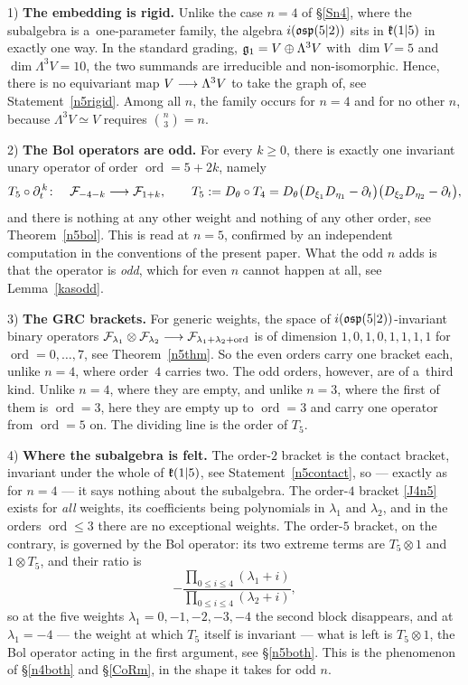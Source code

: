 \documentclass[12pt,a4paper]{amsart}
\theoremstyle{thm}
\theoremstyle{definition}
\newcommand {\tp}{\otimes}
\newcommand {\Nord}{\operatorname{ord}}   %
\begin{document}
1) \textbf{The embedding is rigid.} Unlike the case $n=4$ of \S\ref{Sn4}, where the
subalgebra is a~one-parameter family, the algebra $i({\mathfrak{osp}}(5|2))$ sits in ${\mathfrak{k}}(1|5)$ in
exactly one way. In the standard grading, ${\mathfrak{g}}_1=V\oplus\Lambda^3V$ with $\dim V=5$ and
$\dim\Lambda^3V=10$, the two summands are irreducible and non-isomorphic. Hence, there is no
equivariant map $V\longrightarrow\Lambda^3V$ to take the graph of, see Statement~\ref{n5rigid}. Among all
$n$, the family occurs for $n=4$ and for no other $n$, because $\Lambda^3V\simeq V$ requires
$\binom{n}{3}=n$.

2) \textbf{The Bol operators are odd.} For every $k\geq0$, there is exactly one
invariant unary operator of order $\Nord=5+2k$, namely
\[
T_5\circ\partial_t^{\,k}\colon\quad{\mathcal F}_{-4-k}\longrightarrow{\mathcal F}_{1+k},\qquad
T_5:=D_{\theta}\circ T_4=D_{\theta}\big(D_{\xi_1}D_{\eta_1}-\partial_t\big)
\big(D_{\xi_2}D_{\eta_2}-\partial_t\big),
\]
and there is nothing at any other weight and nothing of any other order, see
Theorem~\ref{n5bol}. This is \cite[Thm~1.4.2]{BLS1} read at $n=5$, confirmed by an independent
computation in the conventions of the present paper. What the odd $n$ adds is that the operator
is \textit{odd}, which for even $n$ cannot happen at all, see Lemma~\ref{kasodd}.

3) \textbf{The GRC brackets.} For generic weights, the space of
$i({\mathfrak{osp}}(5|2))$-invariant binary operators
$\cF_{\lambda_1}\tp\cF_{\lambda_2}\tto\cF_{\lambda_1+\lambda_2+\Nord}$ is of dimension
$1,0,1,0,1,1,1,1$ for $\Nord=0,\dots,7$, see Theorem~\ref{n5thm}. So the even orders carry one bracket each, unlike $n=4$, where
order~$4$ carries two. The odd orders, however, are of a~third kind. Unlike
$n=4$, where they are empty, and unlike $n=3$, where the first of them is $\Nord=3$, here they
are empty up to $\Nord=3$ and carry one operator from $\Nord=5$ on. The dividing line is the
order of $T_5$.

4) \textbf{Where the subalgebra is felt.} The order-$2$ bracket is the contact bracket,
invariant under the whole of ${\mathfrak{k}}(1|5)$, see Statement~\ref{n5contact}, so --- exactly as for
$n=4$ --- it says nothing about the subalgebra. The order-$4$ bracket \eqref{J4n5} exists for
\textit{all} weights, its coefficients being polynomials in $\lambda_1$ and $\lambda_2$, and in
the orders $\Nord\leq3$ there are no exceptional weights. The order-$5$ bracket, on the contrary, is
governed by the Bol operator: its two extreme terms are $T_5\tp1$ and $1\tp T_5$, and their
ratio is
\[
-\frac{\prod_{0\leq i\leq4}(\lambda_1+i)}{\prod_{0\leq i\leq4}(\lambda_2+i)},
\]
so at the five weights $\lambda_1=0,-1,-2,-3,-4$ the second block disappears, and at
$\lambda_1=-4$ --- the weight at which $T_5$ itself is invariant --- what is left is
$T_5\tp1$, the Bol operator acting in the first argument, see \S\ref{n5both}. This is the
phenomenon of \S\ref{n4both} and \S\ref{CoRm}, in the shape it takes for odd $n$.
\end{document}
